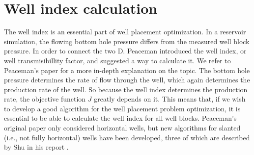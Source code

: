 %
%
%
\chapter{Well index calculation}
%
The well index is an essential part of well
placement optimization.
%
In a reservoir simulation, the flowing bottom hole pressure differs 
from the measured well block pressure. In order to connect the
two D. Peaceman introduced the
well index, or well transmisibillity factor, and
suggested a way to calculate it. We refer to Peaceman's
paper\cite{Peaceman_Paper} for a more in-depth explanation on 
the topic.
%
The bottom hole pressure determines the rate of flow
through the well, which again determines the production
rate of the well. So because the well index determines
the production rate, the objective function $J$ greatly
depends on it. This means that, if we wish to develop a good 
algorithm for the well placement problem optimization, 
it is essential to be able to calculate the well index
for all well blocks.
%
Peaceman's original paper only considered horizontal
wells, but new algorithms for slanted (i.e., not fully
horizontal) wells have been developed, three of which
are described by Shu in his report \cite{Shu_Paper}.
%
